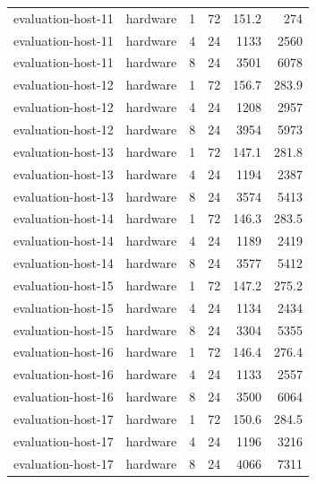 \begin{tabular}{llrrrr}
evaluation-host-11 & hardware & 1 & 72 & 151.2 & 274 \\
evaluation-host-11 & hardware & 4 & 24 & 1133 & 2560 \\
evaluation-host-11 & hardware & 8 & 24 & 3501 & 6078 \\
evaluation-host-12 & hardware & 1 & 72 & 156.7 & 283.9 \\
evaluation-host-12 & hardware & 4 & 24 & 1208 & 2957 \\
evaluation-host-12 & hardware & 8 & 24 & 3954 & 5973 \\
evaluation-host-13 & hardware & 1 & 72 & 147.1 & 281.8 \\
evaluation-host-13 & hardware & 4 & 24 & 1194 & 2387 \\
evaluation-host-13 & hardware & 8 & 24 & 3574 & 5413 \\
evaluation-host-14 & hardware & 1 & 72 & 146.3 & 283.5 \\
evaluation-host-14 & hardware & 4 & 24 & 1189 & 2419 \\
evaluation-host-14 & hardware & 8 & 24 & 3577 & 5412 \\
evaluation-host-15 & hardware & 1 & 72 & 147.2 & 275.2 \\
evaluation-host-15 & hardware & 4 & 24 & 1134 & 2434 \\
evaluation-host-15 & hardware & 8 & 24 & 3304 & 5355 \\
evaluation-host-16 & hardware & 1 & 72 & 146.4 & 276.4 \\
evaluation-host-16 & hardware & 4 & 24 & 1133 & 2557 \\
evaluation-host-16 & hardware & 8 & 24 & 3500 & 6064 \\
evaluation-host-17 & hardware & 1 & 72 & 150.6 & 284.5 \\
evaluation-host-17 & hardware & 4 & 24 & 1196 & 3216 \\
evaluation-host-17 & hardware & 8 & 24 & 4066 & 7311 \\
\bottomrule
\end{tabular}
